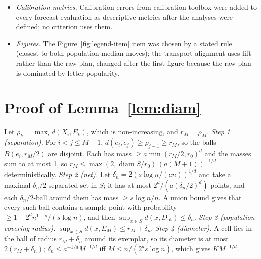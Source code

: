 \documentclass[twoside]{article}
\theoremstyle{definition}
\theoremstyle{remark}
\newcommand{\Dfit}{D_{\mathrm{fit}}}
\newcommand{\1}{\mathbf{1}}
\DeclareMathOperator{\diam}{diam}
\newcommand{\expname}[1]{\textsc{#1}}
\begin{document}
\begin{itemize}
  were designed after the TruthfulQA results were known, in particular after the TruthfulQA family of
  group-versus-recalibration tests had returned no significant result. \expname{PopQA-Elicit} declared its own
  Holm family (three models $\times$ five budgets; one rejection, Mistral at 2{,}396 labels, adjusted
  $p=0.047$). Treating the two datasets as one registered question tested 27 times, no test survives
  (smallest Holm-adjusted $p=0.085$). \expname{PopQA-Elicit} re-elicits PopQA under the
  frozen TruthfulQA templates; before any label was joined its batch size was changed from 32 to 1
  because a padding check failed (differences up to $0.016$), and a loader error that would have read
  the TruthfulQA reports was caught (it failed loudly) and fixed before any analysis ran.
  \item \emph{Calibration metrics.} Calibration errors from calibration-toolbox were added to every
  forecast evaluation as descriptive metrics after the analyses were defined; no criterion uses them.
  \item \emph{Figures.} The Figure~\ref{fig:legend-item} item was chosen by a stated rule (closest to
  both population median moves); the transport alignment uses lift rather than the raw plan, changed
  after the first figure because the raw plan is dominated by letter popularity.
\end{itemize}

\section{Proof of Lemma~\ref{lem:diam}}
\label{app:lemma}
Let $\rho_k=\max_i d(X_i,E_k)$, which is non-increasing, and $r_M=\rho_M$.
\emph{Step 1 (separation).} For $i<j\le M+1$, $d(e_i,e_j)\ge\rho_{j-1}\ge r_M$, so the balls
$B(e_i,r_M/2)$ are disjoint. Each has mass $\ge a\min(r_M/2,r_0)^d$ and the masses sum to at most
1, so $r_M\le\max(2,\diam S/r_0)\,(a(M+1))^{-1/d}$ deterministically.
\emph{Step 2 (net).} Let $\delta_n=2(s\log n/(an))^{1/d}$ and take a maximal $\delta_n/2$-separated
set in $S$; it has at most $2^d/(a(\delta_n/2)^d)$ points, and each $\delta_n/2$-ball around them has
mass $\ge s\log n/n$. A union bound gives that every such ball contains a sample point with
probability $\ge1-2^dn^{1-s}/(s\log n)$, and then $\sup_{x\in S}d(x,\Dfit)\le\delta_n$.
\emph{Step 3 (population covering radius).} $\sup_{x\in S}d(x,E_M)\le r_M+\delta_n$.
\emph{Step 4 (diameter).} A cell lies in the ball of radius $r_M+\delta_n$ around its exemplar, so its
diameter is at most $2(r_M+\delta_n)$; $\delta_n\le a^{-1/d}M^{-1/d}$ iff $M\le n/(2^ds\log n)$, which
gives $KM^{-1/d}$. \hfill$\square$
\end{document}
